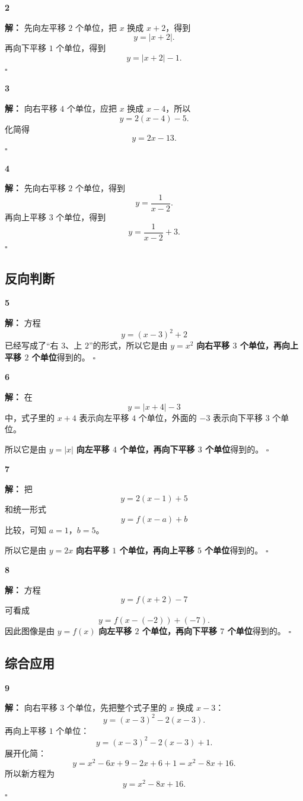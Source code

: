 \documentclass[11pt,a4paper,fontset=fandol]{ctexart}
\theoremstyle{formalexample}
\newenvironment{solution}{\par\noindent\textbf{解：}}{\hfill$\square$\par}
\begin{document}
\textbf{2}\begin{solution}
先向左平移 $2$ 个单位，把 $x$ 换成 $x+2$，得到
\[
y=|x+2|.
\]
再向下平移 $1$ 个单位，得到
\[
\boxed{y=|x+2|-1}.
\]
\end{solution}

\textbf{3}\begin{solution}
向右平移 $4$ 个单位，应把 $x$ 换成 $x-4$，所以
\[
y=2(x-4)-5.
\]
化简得
\[
\boxed{y=2x-13}.
\]
\end{solution}

\textbf{4}\begin{solution}
先向右平移 $2$ 个单位，得到
\[
y=\frac{1}{x-2}.
\]
再向上平移 $3$ 个单位，得到
\[
\boxed{y=\frac{1}{x-2}+3}.
\]
\end{solution}

\subsection*{反向判断}

\textbf{5}\begin{solution}
方程
\[
y=(x-3)^2+2
\]
已经写成了“右 $3$、上 $2$”的形式，所以它是由 $y=x^2$ \textbf{向右平移 $3$ 个单位，再向上平移 $2$ 个单位}得到的。
\end{solution}

\textbf{6}\begin{solution}
在
\[
y=|x+4|-3
\]
中，式子里的 $x+4$ 表示向左平移 $4$ 个单位，外面的 $-3$ 表示向下平移 $3$ 个单位。

所以它是由 $y=|x|$ \textbf{向左平移 $4$ 个单位，再向下平移 $3$ 个单位}得到的。
\end{solution}

\textbf{7}\begin{solution}
把
\[
y=2(x-1)+5
\]
和统一形式
\[
y=f(x-a)+b
\]
比较，可知 $a=1$，$b=5$。

所以它是由 $y=2x$ \textbf{向右平移 $1$ 个单位，再向上平移 $5$ 个单位}得到的。
\end{solution}

\textbf{8}\begin{solution}
方程
\[
y=f(x+2)-7
\]
可看成
\[
y=f(x-(-2))+(-7).
\]
因此图像是由 $y=f(x)$ \textbf{向左平移 $2$ 个单位，再向下平移 $7$ 个单位}得到的。
\end{solution}

\subsection*{综合应用}

\textbf{9}\begin{solution}
向右平移 $3$ 个单位，先把整个式子里的 $x$ 换成 $x-3$：
\[
y=(x-3)^2-2(x-3).
\]
再向上平移 $1$ 个单位：
\[
y=(x-3)^2-2(x-3)+1.
\]
展开化简：
\[
y=x^2-6x+9-2x+6+1=x^2-8x+16.
\]
所以新方程为
\[
\boxed{y=x^2-8x+16}.
\]
\end{solution}
\end{document}
